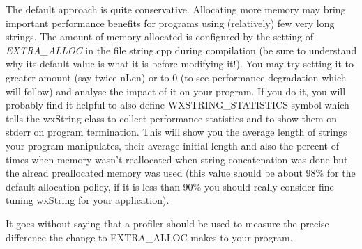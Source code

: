 The default approach is quite conservative. Allocating more memory may bring
important performance benefits for programs using (relatively) few very long
strings. The amount of memory allocated is configured by the setting of {\it
EXTRA\_ALLOC} in the file string.cpp during compilation (be sure to understand
why its default value is what it is before modifying it!). You may try setting
it to greater amount (say twice nLen) or to 0 (to see performance degradation
which will follow) and analyse the impact of it on your program. If you do it,
you will probably find it helpful to also define WXSTRING\_STATISTICS symbol
which tells the wxString class to collect performance statistics and to show
them on stderr on program termination. This will show you the average length of
strings your program manipulates, their average initial length and also the
percent of times when memory wasn't reallocated when string concatenation was
done but the alread preallocated memory was used (this value should be about
98\% for the default allocation policy, if it is less than 90\% you should
really consider fine tuning wxString for your application).

It goes without saying that a profiler should be used to measure the precise
difference the change to EXTRA\_ALLOC makes to your program.

